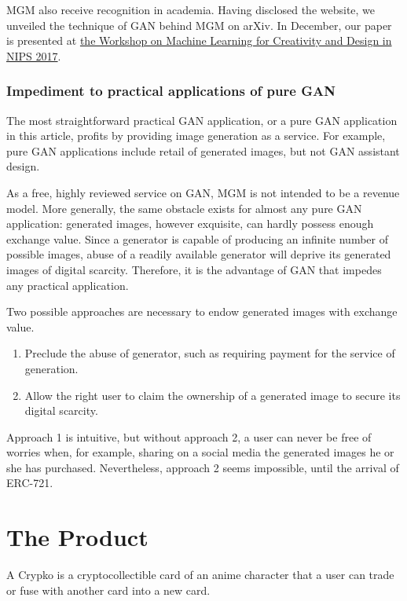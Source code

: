 \documentclass[a4paper]{article}
\begin{document}
MGM also receive recognition in academia. Having disclosed the website, we unveiled the technique of GAN behind MGM on arXiv\cite{jin2017towards}. In December, our paper is presented at \href{https://nips2017creativity.github.io/}{the Workshop on Machine Learning for Creativity and Design in NIPS 2017}.

\subsubsection{Impediment to practical applications of pure GAN}

The most straightforward practical GAN application, or a pure GAN application in this article, profits by providing image generation as a service. For example, pure GAN applications include retail of generated images, but not GAN assistant design.

As a free, highly reviewed service on GAN, MGM is not intended to be a revenue model. More generally, the same obstacle exists for almost any pure GAN application: generated images, however exquisite, can hardly possess enough exchange value. Since a generator is capable of producing an infinite number of possible images, abuse of a readily available generator will deprive its generated images of digital scarcity. Therefore, it is the advantage of GAN that impedes any practical application.

Two possible approaches are necessary to endow generated images with exchange value.

\begin{enumerate}
\item Preclude the abuse of generator, such as requiring payment for the service of generation.
\item Allow the right user to claim the ownership of a generated image to secure its digital scarcity.
\end{enumerate}

Approach 1 is intuitive, but without approach 2, a user can never be free of worries when, for example, sharing on a social media the generated images he or she has purchased. Nevertheless, approach 2 seems impossible, until the arrival of ERC-721. 

\section{The Product}

A Crypko is a cryptocollectible card of an anime character that a user can trade or fuse with another card into a new card.
\end{document}

